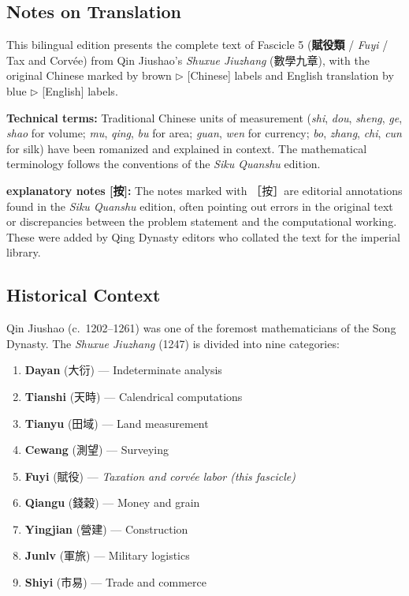 \documentclass[10pt,a4paper]{article}
\begin{document}
\subsection*{Notes on Translation}

This bilingual edition presents the complete text of Fascicle 5 (\textbf{賦役類} / \textit{Fuyi} / Tax and Corv\'{e}e) from Qin Jiushao's \textit{Shuxue Jiuzhang} (數學九章), with the original Chinese marked by brown $\triangleright$ [Chinese] labels and English translation by blue $\triangleright$ [English] labels.

\textbf{Technical terms:} Traditional Chinese units of measurement (\textit{shi}, \textit{dou}, \textit{sheng}, \textit{ge}, \textit{shao} for volume; \textit{mu}, \textit{qing}, \textit{bu} for area; \textit{guan}, \textit{wen} for currency; \textit{bo}, \textit{zhang}, \textit{chi}, \textit{cun} for silk) have been romanized and explained in context. The mathematical terminology follows the conventions of the \textit{Siku Quanshu} edition.

\textbf{explanatory notes [按]:} The notes marked with ［按］are editorial annotations found in the \textit{Siku Quanshu} edition, often pointing out errors in the original text or discrepancies between the problem statement and the computational working. These were added by Qing Dynasty editors who collated the text for the imperial library.

\subsection*{Historical Context}

Qin Jiushao (c.\ 1202--1261) was one of the foremost mathematicians of the Song Dynasty. The \textit{Shuxue Jiuzhang} (1247) is divided into nine categories:

\begin{enumerate}
    \item \textbf{Dayan} (大衍) --- Indeterminate analysis
    \item \textbf{Tianshi} (天時) --- Calendrical computations
    \item \textbf{Tianyu} (田域) --- Land measurement
    \item \textbf{Cewang} (測望) --- Surveying
    \item \textbf{Fuyi} (賦役) --- \textit{Taxation and corv\'{e}e labor (this fascicle)}
    \item \textbf{Qiangu} (錢穀) --- Money and grain
    \item \textbf{Yingjian} (營建) --- Construction
    \item \textbf{Junlv} (軍旅) --- Military logistics
    \item \textbf{Shiyi} (市易) --- Trade and commerce
\end{enumerate}
\end{document}
